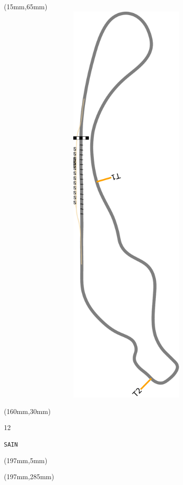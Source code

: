 \begin{textblock*}{185mm}(15mm,65mm)%
\centering
\mbox{\includegraphics[width=185mm,height=210mm,keepaspectratio]{PT/SAIN.pdf}}
\end{textblock*}
\begin{textblock*}{40mm}(160mm,30mm)%
\Large
\par{} 
\par12 
\par\hfill\tiny\tt SAIN\\
\end{textblock*}
\begin{textblock*}{20mm}(197mm,5mm)%
\fbox{\thepage}
\label{SAIN}
\end{textblock*}
\begin{textblock*}{20mm}(197mm,285mm)%
\fbox{\thepage}
\end{textblock*}

